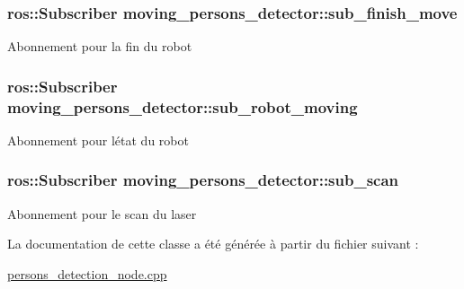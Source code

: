 \subsubsection[{\texorpdfstring{sub\+\_\+finish\+\_\+move}{sub_finish_move}}]{\setlength{\rightskip}{0pt plus 5cm}ros\+::\+Subscriber moving\+\_\+persons\+\_\+detector\+::sub\+\_\+finish\+\_\+move\hspace{0.3cm}{\ttfamily [private]}}\hypertarget{classmoving__persons__detector_a212ab693f8f575f3770d76efd51bb215}{}\label{classmoving__persons__detector_a212ab693f8f575f3770d76efd51bb215}
Abonnement pour la fin du robot 
\subsubsection[{\texorpdfstring{sub\+\_\+robot\+\_\+moving}{sub_robot_moving}}]{\setlength{\rightskip}{0pt plus 5cm}ros\+::\+Subscriber moving\+\_\+persons\+\_\+detector\+::sub\+\_\+robot\+\_\+moving\hspace{0.3cm}{\ttfamily [private]}}\hypertarget{classmoving__persons__detector_a2ebd9075ece54b52335ba5aa7c7e073e}{}\label{classmoving__persons__detector_a2ebd9075ece54b52335ba5aa7c7e073e}
Abonnement pour l\textquotesingle{}état du robot 
\subsubsection[{\texorpdfstring{sub\+\_\+scan}{sub_scan}}]{\setlength{\rightskip}{0pt plus 5cm}ros\+::\+Subscriber moving\+\_\+persons\+\_\+detector\+::sub\+\_\+scan\hspace{0.3cm}{\ttfamily [private]}}\hypertarget{classmoving__persons__detector_a4927f845c4631be26ced13aa0f306161}{}\label{classmoving__persons__detector_a4927f845c4631be26ced13aa0f306161}
Abonnement pour le scan du laser 

La documentation de cette classe a été générée à partir du fichier suivant \+:\begin{DoxyCompactItemize}
\item 
\hyperlink{persons__detection__node_8cpp}{persons\+\_\+detection\+\_\+node.\+cpp}\end{DoxyCompactItemize}
